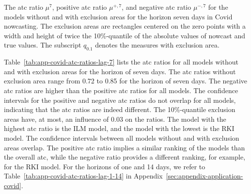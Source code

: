 \documentclass[pdflatex]{sn-jnl}
\theoremstyle{plain}%
\theoremstyle{definition}
\newcommand{\acc}{\mu}
\newcommand{\accl}[1][l]{\mu^{#1}}
\newcommand{\accpl}[1][l]{\acc^{+,#1}}
\newcommand{\accml}[1][l]{\acc^{-,#1}}
\begin{document}
\begin{table}
    \centering
    \tiny
    
    \caption[The ATC ratios for Covid nowcasting.]{The \ac{atc} ratio $\accl[7]$, positive \ac{atc} ratio $\accpl[7]$, and negative \ac{atc} ratio $\accml[7]$ for the models without and with exclusion areas for the horizon seven days in Covid nowcasting. The exclusion areas are rectangles centered on the zero points with a width and height of twice the 10\%-quantile of the absolute values of nowcast and true values. The subscript $q_{0.1}$ denotes the measures with exclusion area. }
    \label{tab:app-covid-atc-ratios-lag-7}
\end{table}

Table~\ref{tab:app-covid-atc-ratios-lag-7} lists the \ac{atc} ratios for all models without and with exclusion areas for the horizon of seven days.
The \ac{atc} ratios without exclusion area range from 0.72 to 0.85 for the horizon of seven days.
The negative \ac{atc} ratios are higher than the positive \ac{atc} ratios for all models.
The confidence intervals for the positive and negative \ac{atc} ratios do not overlap for all models, indicating that the \ac{atc} ratios are indeed different.
The 10\%-quantile exclusion areas have, at most, an influence of 0.03 on the ratios.
The model with the highest \ac{atc} ratio is the ILM model, and the model with the lowest is the RKI model.
The confidence intervals between all models without and with exclusion areas overlap.
The positive \ac{atc} ratio implies a similar ranking of the models than the overall \ac{atc}, while the negative ratio provides a different ranking, for example, for the RKI model.
For the horizons of one and 14 days, we refer to Table~\ref{tab:app-covid-atc-ratios-lag-1-14} in Appendix~\ref{sec:appendix-application-covid}.
\end{document}
